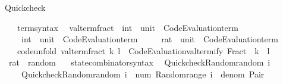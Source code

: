 \begin{isabellebody}
\endisatagproof
{\isafoldproof}%
%
\isadelimproof
%
\endisadelimproof
%
\begin{isamarkuptext}%
Quickcheck%
\end{isamarkuptext}\isamarkuptrue%
\isamarkupfalse%
\isanewline
\ \ \ term{\isacharunderscore}{\kern0pt}syntax\isanewline
{}\isanewline
\isanewline
{}\isamarkupfalse%
\isanewline
\ \ valterm{\isacharunderscore}{\kern0pt}fract\ {\isacharcolon}{\kern0pt}{\isacharcolon}{\kern0pt}\ {\isachardoublequoteopen}int\ {\isasymtimes}\ {\isacharparenleft}{\kern0pt}unit\ {\isasymRightarrow}\ Code{\isacharunderscore}{\kern0pt}Evaluation{\isachardot}{\kern0pt}term{\isacharparenright}{\kern0pt}\ {\isasymRightarrow}\isanewline
\ \ \ \ int\ {\isasymtimes}\ {\isacharparenleft}{\kern0pt}unit\ {\isasymRightarrow}\ Code{\isacharunderscore}{\kern0pt}Evaluation{\isachardot}{\kern0pt}term{\isacharparenright}{\kern0pt}\ {\isasymRightarrow}\isanewline
\ \ \ \ rat\ {\isasymtimes}\ {\isacharparenleft}{\kern0pt}unit\ {\isasymRightarrow}\ Code{\isacharunderscore}{\kern0pt}Evaluation{\isachardot}{\kern0pt}term{\isacharparenright}{\kern0pt}{\isachardoublequoteclose}\isanewline
\ \ \ {\isacharbrackleft}{\kern0pt}code{\isacharunderscore}{\kern0pt}unfold{\isacharbrackright}{\kern0pt}{\isacharcolon}{\kern0pt}\ {\isachardoublequoteopen}valterm{\isacharunderscore}{\kern0pt}fract\ k\ l\ {\isacharequal}{\kern0pt}\ Code{\isacharunderscore}{\kern0pt}Evaluation{\isachardot}{\kern0pt}valtermify\ Fract\ {\isacharbraceleft}{\kern0pt}{\isasymcdot}{\isacharbraceright}{\kern0pt}\ k\ {\isacharbraceleft}{\kern0pt}{\isasymcdot}{\isacharbraceright}{\kern0pt}\ l{\isachardoublequoteclose}\isanewline
\isanewline
{}\isamarkupfalse%
\isanewline
\isanewline
{}\isamarkupfalse%
\ rat\ {\isacharcolon}{\kern0pt}{\isacharcolon}{\kern0pt}\ random\isanewline
{}\isanewline
\isanewline
{}\isamarkupfalse%
\isanewline
\ \ \ state{\isacharunderscore}{\kern0pt}combinator{\isacharunderscore}{\kern0pt}syntax\isanewline
{}\isanewline
\isanewline
{}\isamarkupfalse%
\isanewline
\ \ {\isachardoublequoteopen}Quickcheck{\isacharunderscore}{\kern0pt}Random{\isachardot}{\kern0pt}random\ i\ {\isacharequal}{\kern0pt}\isanewline
\ \ \ \ Quickcheck{\isacharunderscore}{\kern0pt}Random{\isachardot}{\kern0pt}random\ i\ {\isasymcirc}{\isasymrightarrow}\ {\isacharparenleft}{\kern0pt}{\isasymlambda}num{\isachardot}{\kern0pt}\ Random{\isachardot}{\kern0pt}range\ i\ {\isasymcirc}{\isasymrightarrow}\ {\isacharparenleft}{\kern0pt}{\isasymlambda}denom{\isachardot}{\kern0pt}\ Pair\isanewline

\end{isabellebody}
